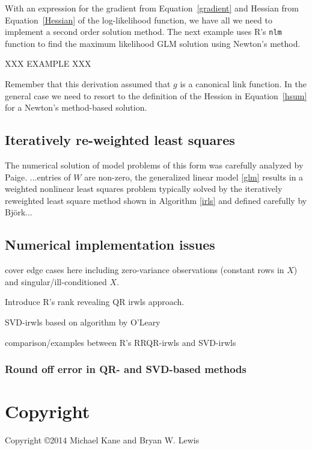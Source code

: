 \documentclass[10pt]{article} %
\begin{document}
With an expression for the gradient from Equation~\ref{gradient} and Hessian
from Equation~\ref{Hessian} of the log-likelihood function, we have all we need
to implement a second order solution method. The next example uses R's
\verb+nlm+ function to find the maximum likelihood GLM solution using Newton's
method.

XXX EXAMPLE XXX

Remember that this derivation assumed that $g$ is a canonical link function. In
the general case we need to resort to the definition of the Hession in
Equation~\ref{hsum} for a Newton's method-based solution.



\subsection*{Iteratively re-weighted least squares}




The numerical solution of model problems of this form was carefully analyzed by
Paige\cite{paige}.
...entries of $W$ are non-zero, the generalized linear model
\ref{glm} results in a weighted nonlinear least squares problem
typically solved by the iteratively reweighted least square method
shown in Algorithm \ref{irls} and defined carefully by Bj\"ork\cite{bjork}...

\subsection*{Numerical implementation issues}

cover edge cases here including zero-variance observations (constant rows in $X$)
and singular/ill-conditioned $X$.

Introduce R's rank revealing QR irwls approach.

SVD-irwls based on algorithm by O'Leary

comparison/examples between R's RRQR-irwls and SVD-irwls

\subsubsection*{Round off error in QR- and SVD-based methods}











\section*{Copyright}
Copyright \copyright  2014 Michael Kane and Bryan W. Lewis
\end{document}
